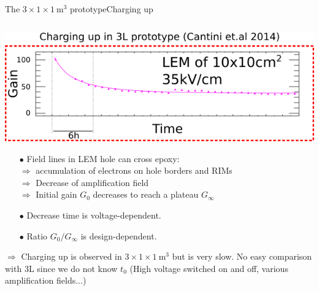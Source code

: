 \documentclass[10pt]{beamer}
\begin{document}
    \begin{frame}{The \texorpdfstring{$3 \times 1 \times \SI{1}{\meter\cubed}$}{311} prototype}{Charging up}
    	\begin{scriptsize}
    		\begin{columns}
    			\begin{column}{0.45\textwidth}
    				\includegraphics[width=\textwidth]{figures/311/3L_charging_up.png}\\
    				\vfill
    				\begin{itemize}
    					\item[$\bullet$] Field lines in LEM hole can cross epoxy:\\
    					 $\Rightarrow$ accumulation of electrons on hole borders and RIMs\\
    					 $\Rightarrow$ Decrease of amplification field\\
    					 $\Rightarrow$ Initial gain $G_0$ decreases to reach a plateau $G_{\infty}$
    					 \item[$\bullet$] Decrease time is voltage-dependent.
    					 \item[$\bullet$] Ratio $G_0/G_{\infty}$ is design-dependent.
	    			\end{itemize}
	    			$\Rightarrow$ Charging up is observed in $3 \times 1 \times \SI{1}{\meter\cubed}$ but is very slow. No easy comparison with 3L since we do not know $t_0$ (High voltage switched on and off, various amplification fields...)

\end{column}
\end{columns}
\end{scriptsize}
\end{frame}
\end{document}
